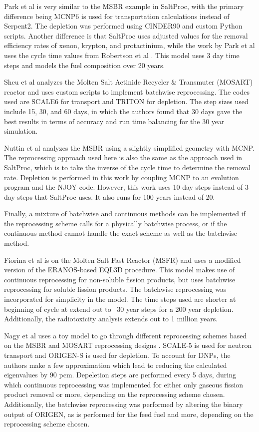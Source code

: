 Park et al \cite{park_whole_2015} is very similar to the MSBR example in SaltProc, with the primary difference being MCNP6 is used for transportation calculations instead of Serpent2. The depletion was performed using CINDER90 and custom Python scripts. Another difference is that SaltProc uses adjusted values for the removal efficiency rates of xenon, krypton, and protactinium, while the work by Park et al uses the cycle time values from Robertson et al \cite{robertson_conceptual_1971}. This model uses 3 day time steps and models the fuel composition over 20 years.

Sheu et al \cite{sheu_depletion_2013} analyzes the Molten Salt Actinide Recycler \& Transmuter (MOSART) reactor and uses custom scripts to implement batchwise reprocessing. The codes used are SCALE6 for transport and TRITON for depletion. The step sizes used include 15, 30, and 60 days, in which the authors found that 30 days gave the best results in terms of accuracy and run time balancing for the 30 year simulation.

Nuttin et al \cite{nuttin_potential_2005} analyzes the MSBR using a slightly simplified geometry with MCNP. The reprocessing approach used here is also the same as the approach used in SaltProc, which is to take the inverse of the cycle time to determine the removal rate. Depletion is performed in this work by coupling MCNP to an evolution program and the NJOY code. However, this work uses 10 day steps instead of 3 day steps that SaltProc uses. It also runs for 100 years instead of 20.

Finally, a mixture of batchwise and continuous methods can be implemented if the reprocessing scheme calls for a physically batchwise process, or if the continuous method cannot handle the exact scheme as well as the batchwise method.

Fiorina et al \cite{fiorina_preliminary_2012} is on the Molten Salt Fast Reactor (MSFR) and uses a modified version of the ERANOS-based EQL3D procedure. This model makes use of continuous reprocessing for non-soluble fission products, but uses batchwise reprocessing for soluble fission products. The batchwise reprocessing was incorporated for simplicity in the model. The time steps used are shorter at beginning of cycle at extend out to ~30 year steps for a 200 year depletion. Additionally, the radiotoxicity analysis extends out to 1 million years.

Nagy et al \cite{nagy_parametric_2008} uses a toy model to go through different reprocessing schemes based on the MSBR and MOSART reprocessing designs \cite{robertson_conceptual_1971, ignatiev_progress_2007}. SCALE-5 \cite{noauthor_scale_2005} is used for neutron transport and ORIGEN-S is used for depletion. To account for DNPs, the authors make a few approximation which lead to reducing the calculated eigenvalues by 90 pcm. Depeletion steps are performed every 5 days, during which continuous reprocessing was implemented for either only gaseous fission product removal or more, depending on the reprocessing scheme chosen. Additionally, the batchwise reprocessing was performed by altering the binary output of ORIGEN, as is performed for the feed fuel and more, depending on the reprocessing scheme chosen.

